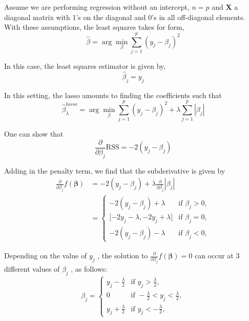 \documentclass[12pt,a4paper]{article}%
\theoremstyle{definition}
\theoremstyle{plain}
\numberwithin{equation}{section}
\newcounter{subsubsubsection}[subsubsection]
\begin{document}

\subsubsubsection{\textcolor{blue}{A simple case for the Lasso}}
Assume we are performing regression without an intercept, $n=p$ and $\mathbf{X}$ a diagonal matrix with 1's on the diagonal and 0's in all off-diagonal elements.
With these assumptions, the least squares takes for form,
\begin{equation}
\hat{\beta} = \arg\min_{\beta} \sum\limits_{j=1}^{p} (y_{j}-\beta_{j})^{2}
\end{equation}


In this case, the least squares estimator is given by,
\begin{equation*}
\hat{\beta}_{j} = y_{j}
\end{equation*}

In this setting, the lasso amounts to finding the coefficients such that
\begin{equation}
\hat{\beta}_{\lambda}^{lasso} = \arg\min_{\beta} \sum\limits_{j=1}^{p} (y_{j}-\beta_{j})^{2} + \lambda \sum\limits_{j=1}^{p} |\beta_{j}|
\end{equation}

One can show that
\begin{equation}
\frac{\partial}{\partial \beta_{j}} \text{RSS} = -2(y_{j}-\beta_{j})
\end{equation}

Adding in the penalty term, we find that the subderivative is given by
\begin{align*}
\frac{\partial}{\partial \beta_{j}} f(\boldsymbol{\beta}) &= -2(y_{j}-\beta_{j}) + \lambda \frac{\partial}{\partial \beta_{j}} |\beta_{j}| \\
													      &= \left\{
\begin{array}{ll}
-2(y_{j}-\beta_{j})+\lambda & \mbox{if } \beta_{j} > 0, \\
{[}-2y_{j}-\lambda,-2y_{j}+\lambda{]} & \mbox{if } \beta_{j} = 0, \\
-2(y_{j}-\beta_{j})-\lambda & \mbox{if } \beta_{j} < 0,
\end{array} \right.
\end{align*}

Depending on the value of $y_{j}$ , the solution to $\frac{\partial}{\partial \beta_{j}} f(\boldsymbol{\beta}) =0$ can occur at 3 different values of $\beta_{j}$ , as follows:
\begin{equation*}
\beta_{j} = \left\{
\begin{array}{ll}
y_{j}-\frac{\lambda}{2}   & \mbox{if }  y_{j} > \frac{\lambda}{2}, \\
 0 & \mbox{if } -\frac{\lambda}{2}<y_{j}< \frac{\lambda}{2}, \\
y_{j}+\frac{\lambda}{2}   & \mbox{if } y_{j} < -\frac{\lambda}{2},
\end{array} \right.
\end{equation*}
\end{document}

